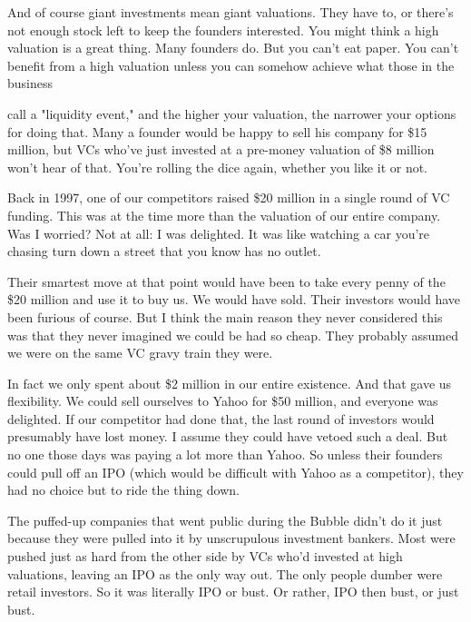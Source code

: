 And of course giant investments mean giant
                  valuations. They have to, or there's not enough stock left to
                  keep the founders interested. You might think a high valuation
                  is a great thing. Many founders do. But you can't eat paper.
                  You can't benefit from a high valuation unless you can somehow
                  achieve what those in the business
                  
                  call a "liquidity event," and the higher your valuation, the
                  narrower your options for doing that. Many a founder would be
                  happy to sell his company for \$15 million, but VCs who've just
                  invested at a pre-money valuation of \$8 million won't hear of
                  that. You're rolling the dice again, whether you like it or
                  not.

Back in 1997, one of our competitors raised
                  \$20 million in a single round of VC funding. This was at the
                  time more than the valuation of our entire company. Was I
                  worried? Not at all: I was delighted. It was like watching a
                  car you're chasing turn down a street that you know has no
                  outlet.

Their smartest move at that point would
                  have been to take every penny of the \$20 million and use it to
                  buy us. We would have sold. Their investors would have been
                  furious of course. But I think the main reason they never
                  considered this was that they never imagined we could be had
                  so cheap. They probably assumed we were on the same VC gravy
                  train they were.

In fact we only spent about \$2
                  million in our entire existence. And that gave us flexibility.
                  We could sell ourselves to Yahoo for \$50 million, and everyone
                  was delighted. If our competitor had done that, the last round
                  of investors would presumably have lost money. I assume they
                  could have vetoed such a deal. But no one those days was
                  paying a lot more than Yahoo. So unless their founders could
                  pull off an IPO (which would be difficult with Yahoo as a
                  competitor), they had no choice but to ride the thing down.

The
                  puffed-up companies that went public during the Bubble didn't
                  do it just because they were pulled into it by unscrupulous
                  investment bankers. Most were pushed just as hard from the
                  other side by VCs who'd invested at high valuations, leaving
                  an IPO as the only way out. The only people dumber were retail
                  investors. So it was literally IPO or bust. Or rather, IPO
                  then bust, or just bust.

